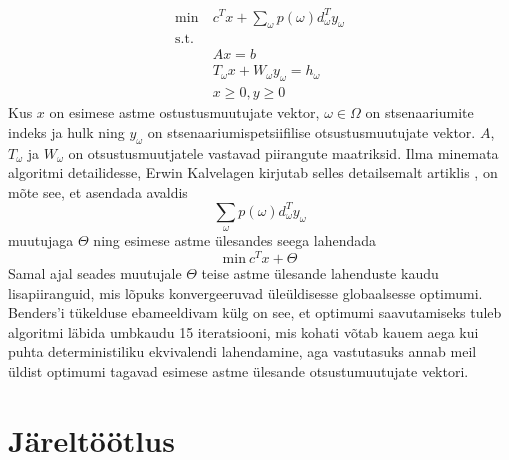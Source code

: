 \documentclass[10pt,a4paper]{article}
\begin{document}
\begin{align}
\textrm{min}\: & c^T x+ \sum_\omega p(\omega)d_\omega^T y_\omega \nonumber \\
\textrm{s.t.}             & \nonumber \\
&Ax = b \nonumber \\
&T_\omega x + W_\omega y_\omega = h_\omega \nonumber \\
& x \geq 0, y \geq 0 \nonumber
\end{align}
Kus $x$ on esimese astme ostustusmuutujate vektor, $\omega \in \Omega$ on stsenaariumite indeks ja hulk ning $y_\omega$ on stsenaariumi\-spetsiifilise otsustusmuutujate vektor. $A$, $T_\omega$ ja $W_\omega$ on otsustusmuutjatele vastavad piirangute maatriksid. Ilma minemata algoritmi detailidesse, Erwin Kalvelagen kirjutab selles detailsemalt artiklis \cite{Kalvelagen2014}, on mõte see, et asendada avaldis 
\begin{equation}
\sum_\omega p(\omega)d_\omega^T y_\omega \nonumber
\end{equation}
muutujaga $\Theta$ ning esimese astme ülesandes seega lahendada 
\begin{equation}
\textrm{min} \: c^T x+\Theta \nonumber
\end{equation}
Samal ajal seades muutujale $\Theta$ teise astme ülesande lahenduste kaudu lisapiiranguid, mis lõpuks konvergeeruvad üleüldisesse globaalsesse optimumi. Benders'i tükelduse ebameeldivam külg on see, et optimumi saavutamiseks tuleb algoritmi läbida umbkaudu 15 iteratsiooni, mis kohati võtab kauem aega kui puhta deterministiliku ekvivalendi lahendamine, aga vastutasuks annab meil üldist optimumi tagavad esimese astme ülesande otsustumuutujate vektori.

\section{Järeltöötlus}
\label{sec:jareltootlus}


\appendix







{}
\end{document}
